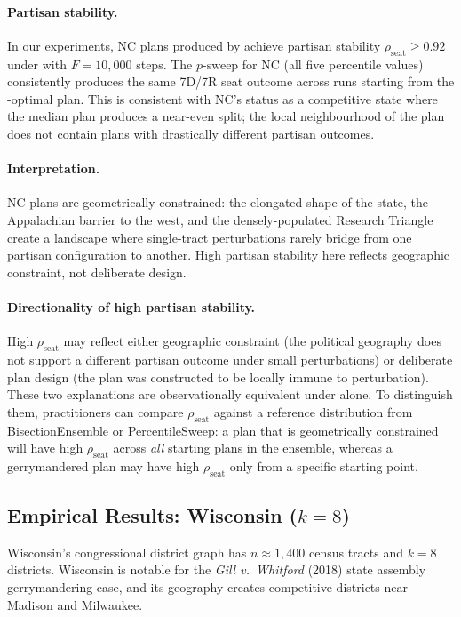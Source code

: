 \paragraph{Partisan stability.}
In our experiments, NC plans produced by \cs{} achieve partisan stability
$\rho_{\mathrm{seat}} \geq 0.92$ under \flip{} with $F = 10{,}000$ steps.
The $p$-sweep for NC (all five percentile values) consistently produces the
same 7D/7R seat outcome across runs starting from the \cs{}-optimal plan.
This is consistent with NC's status as a competitive state where the median
plan produces a near-even split; the local neighbourhood of the \cs{} plan
does not contain plans with drastically different partisan outcomes.

\paragraph{Interpretation.}
NC plans are geometrically constrained: the elongated shape of the state,
the Appalachian barrier to the west, and the densely-populated Research
Triangle create a landscape where single-tract perturbations rarely bridge
from one partisan configuration to another.
High partisan stability here reflects geographic constraint, not deliberate
design.

\paragraph{Directionality of high partisan stability.}
High $\rho_{\mathrm{seat}}$ may reflect either geographic constraint (the
political geography does not support a different partisan outcome under small
perturbations) or deliberate plan design (the plan was constructed to be
locally immune to perturbation).
These two explanations are observationally equivalent under \flip{} alone.
To distinguish them, practitioners can compare $\rho_{\mathrm{seat}}$
against a reference distribution from BisectionEnsemble or PercentileSweep:
a plan that is geometrically constrained will have high $\rho_{\mathrm{seat}}$
across \emph{all} starting plans in the ensemble, whereas a gerrymandered
plan may have high $\rho_{\mathrm{seat}}$ only from a specific starting
point.

\subsection{Empirical Results: Wisconsin ($k = 8$)}

Wisconsin's congressional district graph has $n \approx 1{,}400$ census
tracts and $k = 8$ districts.
Wisconsin is notable for the \textit{Gill v.\ Whitford} (2018) state
assembly gerrymandering case, and its geography creates competitive
districts near Madison and Milwaukee.

